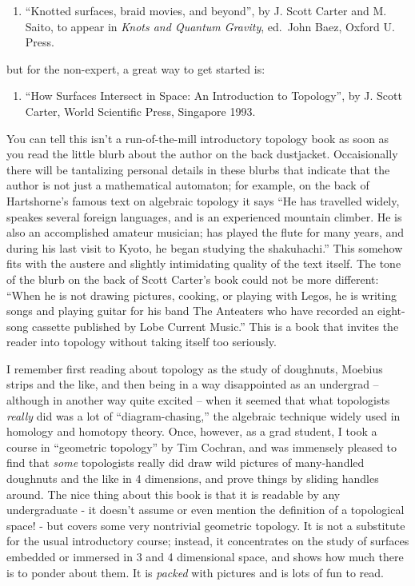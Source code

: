 \documentclass{article}
\def\tightlist{}
\begin{document}
\begin{enumerate}
\def\labelenumi{\arabic{enumi})}
\tightlist
\item
  ``Knotted surfaces, braid movies, and beyond'', by J. Scott Carter and
  M. Saito, to appear in \emph{Knots and Quantum Gravity}, ed.~John
  Baez, Oxford U. Press.
\end{enumerate}

but for the non-expert, a great way to get started is:

\begin{enumerate}
\def\labelenumi{\arabic{enumi})}
\setcounter{enumi}{1}
\tightlist
\item
  ``How Surfaces Intersect in Space: An Introduction to Topology'', by
  J. Scott Carter, World Scientific Press, Singapore 1993.
\end{enumerate}

You can tell this isn't a run-of-the-mill introductory topology book as
soon as you read the little blurb about the author on the back
dustjacket. Occaisionally there will be tantalizing personal details in
these blurbs that indicate that the author is not just a mathematical
automaton; for example, on the back of Hartshorne's famous text on
algebraic topology it says ``He has travelled widely, speakes several
foreign languages, and is an experienced mountain climber. He is also an
accomplished amateur musician; has played the flute for many years, and
during his last visit to Kyoto, he began studying the shakuhachi.'' This
somehow fits with the austere and slightly intimidating quality of the
text itself. The tone of the blurb on the back of Scott Carter's book
could not be more different: ``When he is not drawing pictures, cooking,
or playing with Legos, he is writing songs and playing guitar for his
band The Anteaters who have recorded an eight-song cassette published by
Lobe Current Music.'' This is a book that invites the reader into
topology without taking itself too seriously.

I remember first reading about topology as the study of doughnuts,
Moebius strips and the like, and then being in a way disappointed as an
undergrad -- although in another way quite excited -- when it seemed
that what topologists \emph{really} did was a lot of
``diagram-chasing,'' the algebraic technique widely used in homology and
homotopy theory. Once, however, as a grad student, I took a course in
``geometric topology'' by Tim Cochran, and was immensely pleased to find
that \emph{some} topologists really did draw wild pictures of
many-handled doughnuts and the like in 4 dimensions, and prove things by
sliding handles around. The nice thing about this book is that it is
readable by any undergraduate - it doesn't assume or even mention the
definition of a topological space! - but covers some very nontrivial
geometric topology. It is not a substitute for the usual introductory
course; instead, it concentrates on the study of surfaces embedded or
immersed in 3 and 4 dimensional space, and shows how much there is to
ponder about them. It is \emph{packed} with pictures and is lots of fun
to read.
\end{document}
